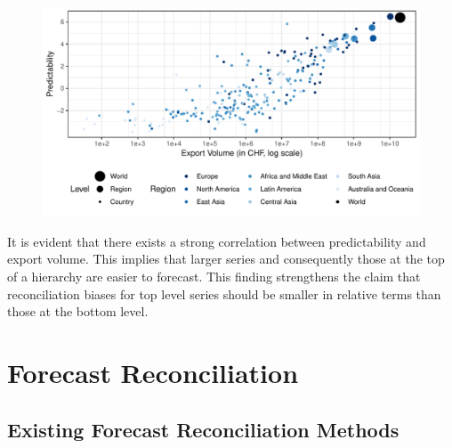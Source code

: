 \documentclass[a4paper,fleqn,11pt]{article}
\begin{document}
\begin{figure}[H]
	\includegraphics[width=\textwidth]{fig/fig_confetti}
	\label{fig:feature}
\end{figure}

It is evident that there exists a strong correlation between predictability and export volume. This implies that larger series and consequently those at the top of a hierarchy are easier to forecast. This finding strengthens the claim that reconciliation biases for top level series should be smaller in relative terms than those at the bottom level.

\section{Forecast Reconciliation}\label{sec:methods}

\subsection{Existing Forecast Reconciliation Methods}
\end{document}
